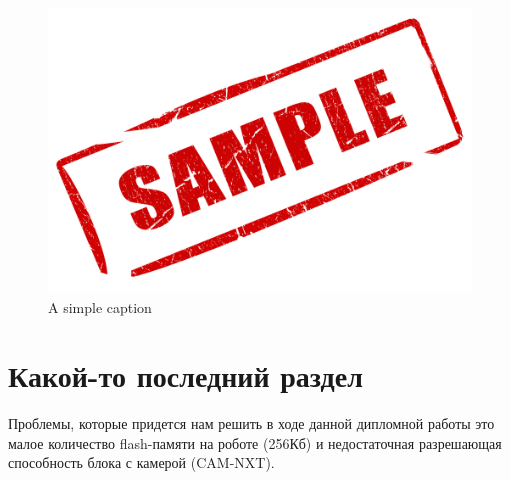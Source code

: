 \begin{figure}[ht!]
 \centering 
 \includegraphics[width=\textwidth]{inc/raster/sample.jpg} 
 \caption{A simple caption} 
 \label{overflow} 
\end{figure}



\section{Какой-то последний раздел}
Проблемы, которые придется нам решить в ходе данной дипломной работы это малое количество flash-памяти на роботе (256Кб) и недостаточная разрешающая способность блока с камерой (CAM-NXT).

